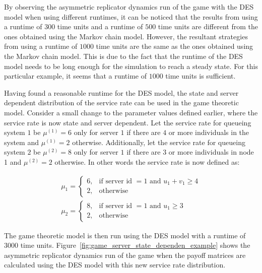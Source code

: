 By observing the asymmetric replicator dynamics run of the game with the DES
model when using different runtimes, it can be noticed that the results from
using a runtime of \(300\) time units and a runtime of \(500\) time units are
different from the ones obtained using the Markov chain model.
However, the resultant strategies from using a runtime of \(1000\) time units
are the same as the ones obtained using the Markov chain model.
This is due to the fact that the runtime of the DES model needs to be long
enough for the simulation to reach a steady state.
For this particular example, it seems that a runtime of \(1000\) time units is
sufficient.


Having found a reasonable runtime for the DES model, the state and server
dependent distribution of the service rate can be used in the game theoretic
model.
Consider a small change to the parameter values defined earlier, where the
service rate is now state and server dependent.
Let the service rate for queueing system \(1\) be \(\mu^{(1)} = 6\) only for
server \(1\) if there are \(4\) or more individuals in the system
and \(\mu^{(1)} = 2\) otherwise.
Additionally, let the service rate for queueing system \(2\) be
\(\mu^{(2)} = 8\) only for server \(1\) if there are \(3\) or more
individuals in node 1 and \(\mu^{(2)} = 2\) otherwise.
In other words the service rate is now defined as:

\begin{align}
    \mu_1 =
    \begin{cases}
        6, & \text{if server id \(= 1\) and } u_1 + v_1 \geq 4 \\
        2, & \text{otherwise}
    \end{cases} \\
    \mu_2 =
    \begin{cases}
        8, & \text{if server id \(= 1\) and } u_1 \geq 3 \\
        2, & \text{otherwise}
    \end{cases}
\end{align}

The game theoretic model is then run using the DES model with a runtime of
\(3000\) time units.
Figure~\ref{fig:game_server_state_dependen_example} shows the asymmetric
replicator dynamics run of the game when the payoff matrices are calculated
using the DES model with this new service rate distribution.

